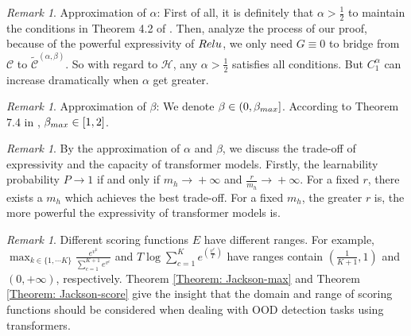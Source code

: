 \documentclass{article}
\theoremstyle{plain}
\theoremstyle{definition}
\theoremstyle{remark}
\newtheorem{remark}[theorem]{Remark}
\begin{document}
\begin{remark}
    Approximation of $\alpha$: First of all, it is definitely that $\alpha>\frac{1}{2}$ to maintain the conditions in Theorem 4.2 of \citet{jiang2023approximation}. Then, analyze the process of our proof, because of the powerful expressivity of ${\rm Relu}$, we only need $G\equiv0$ to bridge from $\mathcal{C}$ to $\widetilde{\mathcal{C}}^{(\alpha, \beta)}$. So with regard to $\mathcal{H}$, any $\alpha>\frac{1}{2}$ satisfies all conditions. But $C_1^{\alpha}$ can increase dramatically when $\alpha$ get greater.
\end{remark}
\begin{remark}
    Approximation of $\beta$: We denote $\beta \in (0,\beta_{\rm max}]$. According to Theorem 7.4 in \citet{devore2021neural}, $\beta_{\rm max} \in [1,2]$.
\end{remark}
\begin{remark}
    By the approximation of $\alpha$ and $\beta$, we discuss the trade-off of expressivity and the capacity of transformer models. Firstly, the learnability probability $P\xrightarrow{}1$ if and only if $m_h\xrightarrow{}+\infty$ and $\frac{r}{m_h}\xrightarrow{}+\infty$. For a fixed $r$, there exists a $m_h$ which achieves the best trade-off. For a fixed $m_h$, the greater $r$ is, the more powerful the expressivity of transformer models is.
\end{remark}
\begin{remark}
   Different scoring functions $E$ have different ranges. For example, $\max_{k\in \{1,\cdots K\}}\frac{e^{v^k}}{\sum_{c=1}^{K+1}e^{v^c}}$ and $T\log\sum_{c=1}^{K}e^{(\frac{v^c}{T})}$ have ranges contain $(\frac{1}{K+1}, 1)$ and $(0,+\infty)$, respectively. Theorem \ref{Theorem: Jackson-max} and Theorem \ref{Theorem: Jackson-score} give the insight that the domain and range of scoring functions should be considered when dealing with OOD detection tasks using transformers. 
\end{remark}
\end{document}
